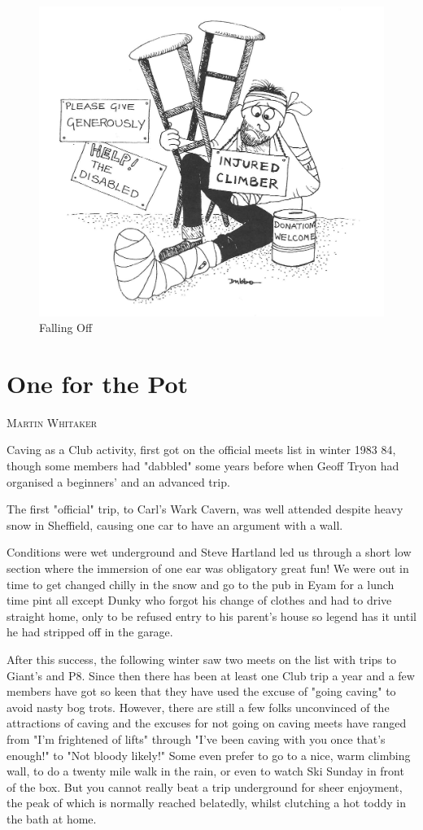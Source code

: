\documentclass[a5paper,openany,font 10pt]{scrbook}
\makeatletter
\newcommand{\chapterauthor}[1]{%
{\parindent0pt\vspace*{-5pt}%
\linespread{1.1}\large\scshape#1%
\par\nobreak\vspace*{35pt}}
\@afterheading%
}
\makeatother
\begin{document}
\begin{figure}[htb]
\centering
\includegraphics[width=.9\linewidth]{./images/Cartoon_09.jpg}
\caption{\label{fig:orge746825}
Falling Off}
\end{figure}

\chapter{One for the Pot}
\label{sec:orgbe80c0e}
\chapterauthor{Martin Whitaker}

Caving as a Club activity, first got on the official meets
list in winter 1983 84, though some members had "dabbled" some
years before when Geoff Tryon had organised a beginners' and an
advanced trip.

The first "official" trip, to Carl's Wark Cavern, was well
attended despite heavy snow in Sheffield, causing one car to have
an argument with a wall.

Conditions were wet underground and Steve Hartland led us
through a short low section where the immersion of one ear was
obligatory   great fun! We were out in time to get changed
 chilly in the snow  and go to the pub in Eyam for a lunch time
pint   all except Dunky who forgot his change of clothes and had
to drive straight home, only to be refused entry to his parent's
house  so legend has it  until he had stripped off in the garage.

After this success, the following winter saw two meets on
the list with trips to Giant's and P8. Since then there has been
at least one Club trip a year and a few members have got so keen
that they have used the excuse of "going caving" to avoid nasty
bog trots. However, there are still a few folks unconvinced of
the attractions of caving and the excuses for  not  going on caving
meets have ranged from "I'm frightened of lifts" through "I've
been caving with you once that's enough!" to "Not bloody likely!"
Some even prefer to go to a nice, warm climbing wall, to do a
twenty mile walk in the rain, or even to watch Ski Sunday in
front of the box. But you cannot really beat a trip underground
for sheer enjoyment, the peak of which is normally reached
belatedly, whilst clutching a hot toddy in the bath at home.
\end{document}
